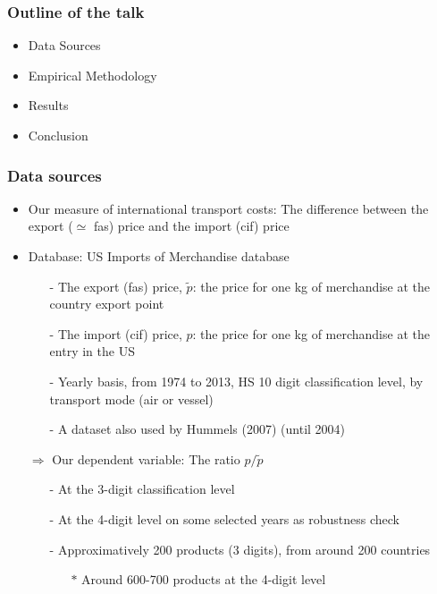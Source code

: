 \documentclass[10 pt,Helvetica, french]{beamer}
\begin{document}
\begin{frame}
\frametitle{Outline of the talk}
\begin{itemize}
\item Data Sources  \vspace{0.1cm}
\item Empirical Methodology \vspace{0.1cm}
\item Results \vspace{0.1cm}
\item Conclusion
\end{itemize}
\end{frame}

\begin{frame} [label=slide_data]
\frametitle{Data sources}
\begin{itemize}
\item Our measure of international transport costs: The difference between the export ($\simeq$ fas) price and the import (cif) price \vspace{0.1cm}
\item Database: US Imports of Merchandise database \hyperlink{app_data}{}\vspace{0.1cm}
\begin{itemize}
\item[-] The export (fas) price, $\widetilde{p}$: the price for one kg of merchandise at the country export point \vspace{0.1cm}
\item[-] The import (cif) price, $p$: the price for one kg of merchandise at the entry in the US \vspace{0.1cm}
\item[-] Yearly basis, from 1974 to 2013, HS 10 digit classification level, by transport mode (air or vessel) \vspace{0.1cm}
\item[-] A dataset also used by Hummels (2007) (until 2004) \vspace{0.1cm}
\end{itemize}
\item[$\Rightarrow$] Our dependent variable: The ratio $p/\widetilde{p}$ \vspace{0.1cm}
\begin{itemize}
\item[-] At the 3-digit classification level  \vspace{0.1cm}
\item[-] At the 4-digit level on some selected years as robustness check \vspace{0.1cm}
\item[-] Approximatively 200 products (3 digits), from around 200 countries  \vspace{0.1cm}
\begin{itemize}
\item[$\ast$] Around 600-700 products at the 4-digit level
\end{itemize}
\end{itemize}
\end{itemize}
\end{frame}
\end{document}
